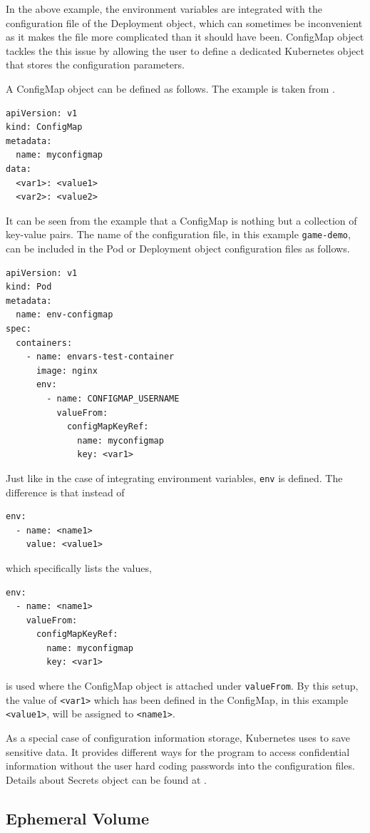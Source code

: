 In the above example, the environment variables are integrated with the configuration file of the Deployment object, which can sometimes be inconvenient as it makes the file more complicated than it should have been. ConfigMap object tackles the this issue by allowing the user to define a dedicated Kubernetes object that stores the configuration parameters.

A ConfigMap object can be defined as follows. The example is taken from \cite{kubernetes2024doc}.
\begin{lstlisting}
apiVersion: v1
kind: ConfigMap
metadata:
  name: myconfigmap
data:
  <var1>: <value1>
  <var2>: <value2>
\end{lstlisting}
It can be seen from the example that a ConfigMap is nothing but a collection of key-value pairs. The name of the configuration file, in this example \texttt{game-demo}, can be included in the Pod or Deployment object configuration files as follows.
\begin{lstlisting}
apiVersion: v1
kind: Pod
metadata:
  name: env-configmap
spec:
  containers:
    - name: envars-test-container
      image: nginx
      env:
        - name: CONFIGMAP_USERNAME
          valueFrom:
            configMapKeyRef:
              name: myconfigmap
              key: <var1>
\end{lstlisting}
Just like in the case of integrating environment variables, \verb|env| is defined. The difference is that instead of 
\begin{lstlisting}
env:
  - name: <name1>
    value: <value1>
\end{lstlisting}
which specifically lists the values,
\begin{lstlisting}
env:
  - name: <name1>
    valueFrom:
      configMapKeyRef:
        name: myconfigmap
        key: <var1>
\end{lstlisting}
is used where the ConfigMap object is attached under \verb|valueFrom|. By this setup, the value of \verb|<var1>| which has been defined in the ConfigMap, in this example \verb|<value1>|, will be assigned to \verb|<name1>|.

As a special case of configuration information storage, Kubernetes uses  to save sensitive data. It provides different ways for the program to access confidential information without the user hard coding passwords into the configuration files. Details about Secrets object can be found at \cite{kubernetes2024doc}.  

\subsection{Ephemeral Volume} \label{subsec:ephemeral_volume}

